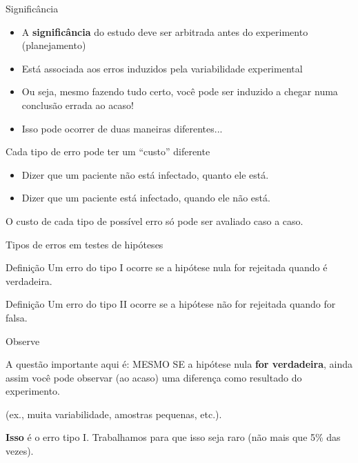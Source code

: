 \documentclass{beamer}
\begin{document}
\begin{frame}{\scriptsize Significância}
  \begin{itemize}
    \footnotesize
  \item A {\bf significância} do estudo deve ser arbitrada antes do experimento (planejamento)
    \medskip
  \item Está associada aos erros induzidos pela variabilidade experimental
    \medskip
  \item Ou seja, mesmo fazendo tudo certo, você pode ser induzido a chegar numa conclusão errada ao acaso!
    \medskip
  \item Isso pode ocorrer de duas maneiras diferentes...
  \end{itemize}
\end{frame}

\begin{frame}{\scriptsize Cada tipo de erro pode ter um ``custo'' diferente}
  \begin{itemize}
    \footnotesize
  \item Dizer que um paciente não está infectado, quanto ele está.
    \medskip
  \item Dizer que um paciente está infectado, quando ele não está.
  \end{itemize}

  \bigskip
  \begin{block}{}
    \footnotesize
    O custo de cada tipo de possível erro só pode ser avaliado caso a caso.
  \end{block}
\end{frame}

\begin{frame}{\scriptsize Tipos de erros em testes de hipóteses}
  \begin{block}{Definição}
    \footnotesize
    Um \alert{erro do tipo I} ocorre se a hipótese nula for rejeitada
    quando é verdadeira.
  \end{block}
  \begin{block}{Definição}
    \footnotesize
    Um \alert{erro do tipo II} ocorre se a hipótese não for rejeitada
    quando for falsa.
  \end{block}
\end{frame}

\begin{frame}[label=observacao]{\scriptsize Observe}
  \begin{block}{A questão importante aqui é:}
    \footnotesize
    MESMO SE a hipótese nula {\bf for verdadeira}, ainda assim você pode observar (ao acaso) uma diferença como resultado do experimento.

    \bigskip
    (ex., muita variabilidade, amostras pequenas, etc.).

    \bigskip
    {\bf Isso} é o erro tipo I.
    \tiny
    Trabalhamos para que isso seja raro (não mais que 5\% das vezes).
  \end{block}
\end{frame}
\end{document}
